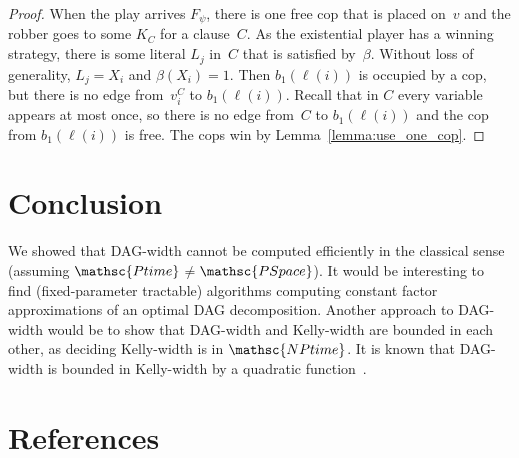 \documentclass[authoryear]{article}
\theoremstyle{definition}
\newcommand{\0}{\emptyset}
\newcommand{\ptime}{\ensuremath{\mathsc{Ptime}}\xspace}
\newcommand{\pspace}{\ensuremath{\mathsc{PSpace}}\xspace}
\newcommand{\nptime}{\ensuremath{\mathsc{NPtime}}\xspace}
\newcommand{\dagw}{DAG-{}width\xspace}
\newcommand{\kw}{Kelly-{}width\xspace}
\begin{document}
\begin{proof}
When the play arrives $F_\psi$, there is one free cop that is placed on~$v$ and 
the robber goes to some $K_C$ for a clause~$C$. As the existential player has a 
winning strategy, there is some literal $L_j$ in~$C$ that is satisfied 
by~$\beta$. Without loss of generality, $L_j = X_i$ and $\beta(X_i) = 1$. Then 
$b_1(\ell(i))$ is occupied by a cop, but there is no edge from~$v_i^C$ to 
$b_1(\ell(i))$. Recall that in $C$ every variable appears at most once, so 
there is no edge from~$C$ to $b_1(\ell(i))$ and the cop from $b_1(\ell(i))$ is 
free. The cops win by Lemma~\ref{lemma:use_one_cop}.
\end{proof}



\section{Conclusion}
We showed that \dagw cannot be computed efficiently in the classical
sense (assuming \ptime${}\neq{}$\pspace).  It would be interesting to
find (fixed-parameter tractable) algorithms computing constant factor
approximations of an optimal DAG decomposition. Another approach to
\dagw would be to show that \dagw and \kw are bounded in each other,
as deciding \kw is in \nptime. It is known that \dagw is
bounded in \kw by a quadratic function~\cite{KaiserKreRabSie14}.


\section*{References}


\end{document}
